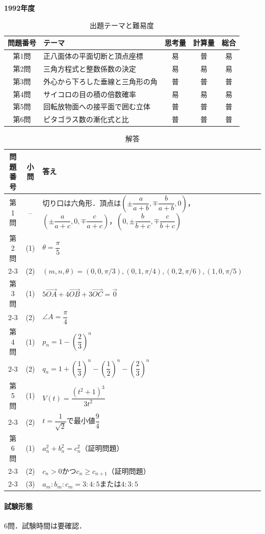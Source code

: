 \documentclass[../../main.tex]{subfiles}
\begin{document}
\begin{center}
  {\fontsize{48pt}{58pt}\selectfont \textbf{1992}\normalsize\textbf{年度}}
\end{center}

\begin{table}[htb]
  \centering
  \caption{出題テーマと難易度}
  \begin{tabular}{|c|p{6.2cm}|c|c|c|}
    \hline
    \textbf{問題番号} & \textbf{テーマ} & \textbf{思考量} & \textbf{計算量} & \textbf{総合} \\
    \hline
    第1問 & 正八面体の平面切断と頂点座標 & 易 & 普 & 易 \\
    \hline
    第2問 & 三角方程式と整数係数の決定 & 易 & 易 & 易 \\
    \hline
    第3問 & 外心から下ろした垂線と三角形の角 & 普 & 普 & 普 \\
    \hline
    第4問 & サイコロの目の積の倍数確率 & 易 & 易 & 易 \\
    \hline
    第5問 & 回転放物面への接平面で囲む立体 & 普 & 普 & 普 \\
    \hline
    第6問 & ピタゴラス数の漸化式と比 & 普 & 普 & 普 \\
    \hline
  \end{tabular}
\end{table}

\begin{table}[htb]
  \centering
  \caption{解答}
  \renewcommand{\arraystretch}{1.4}
  \begin{tabular}{|c|c|p{9cm}|}
    \hline
    \textbf{問題番号} & \textbf{小問} & \textbf{答え} \\
    \hline
    第1問 & -- & 切り口は六角形．頂点は$\left(\pm\dfrac{a}{a+b},\mp\dfrac{b}{a+b},0\right)$，$\left(\pm\dfrac{a}{a+c},0,\mp\dfrac{c}{a+c}\right)$，$\left(0,\pm\dfrac{b}{b+c},\mp\dfrac{c}{b+c}\right)$ \\
    \hline
    第2問 & (1) & $\theta=\dfrac{\pi}{5}$ \\
    \cline{2-3}
    & (2) & $(m,n,\theta)=(0,0,\pi/3),(0,1,\pi/4),(0,2,\pi/6),(1,0,\pi/5)$ \\
    \hline
    第3問 & (1) & $5\overrightarrow{OA}+4\overrightarrow{OB}+3\overrightarrow{OC}=\vec{0}$ \\
    \cline{2-3}
    & (2) & $\angle A=\dfrac{\pi}{4}$ \\
    \hline
    第4問 & (1) & $p_n=1-\left(\dfrac{2}{3}\right)^n$ \\
    \cline{2-3}
    & (2) & $q_n=1+\left(\dfrac{1}{3}\right)^n-\left(\dfrac{1}{2}\right)^n-\left(\dfrac{2}{3}\right)^n$ \\
    \hline
    第5問 & (1) & $V(t)=\dfrac{(t^2+1)^3}{3t^2}$ \\
    \cline{2-3}
    & (2) & $t=\dfrac{1}{\sqrt{2}}$で最小値$\dfrac{9}{4}$ \\
    \hline
    第6問 & (1) & $a_n^2+b_n^2=c_n^2$（証明問題） \\
    \cline{2-3}
    & (2) & $c_n>0$かつ$c_n\ge c_{n+1}$（証明問題） \\
    \cline{2-3}
    & (3) & $a_m:b_m:c_m=3:4:5$または$4:3:5$ \\
    \hline
  \end{tabular}
\end{table}

\paragraph{試験形態}
6問．試験時間は要確認．
\end{document}
